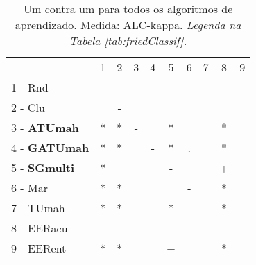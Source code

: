 \begin{table}[h]
\caption{Um contra um para todos os algoritmos de aprendizado. Medida: ALC-kappa. \textit{Legenda na Tabela \ref{tab:friedClassif}.}}
\begin{center}\begin{tabular}{lcc|cc|cc|cc|c}
 			& 1 & 2 & 3 & 4 & 5 & 6 & 7 & 8 & 9\\
1 - Rnd  	& - &   &   &   &   &   &   &   &   \\
2 - Clu  	&   & - &   &   &   &   &   &   &   \\ \hline
3 - \textbf{ATUmah}	& * & * & - &   & * &   &   & * &   \\
4 - \textbf{GATUmah}	& * & * &   & - & * & . &   & * &   \\ \hline
5 - \textbf{SGmulti}	& * &   &   &   & - &   &   & + &   \\
6 - Mar  	& * & * &   &   &   & - &   & * &   \\ \hline
7 - TUmah	& * & * &   &   & * &   & - & * &   \\
8 - EERacu	&   &   &   &   &   &   &   & - &   \\ \hline
9 - EERent	& * & * &   &   & + &   &   & * & - \\\end{tabular}
\label{stratsALCKappaFriedAllReduxall}
\end{center}
\end{table}